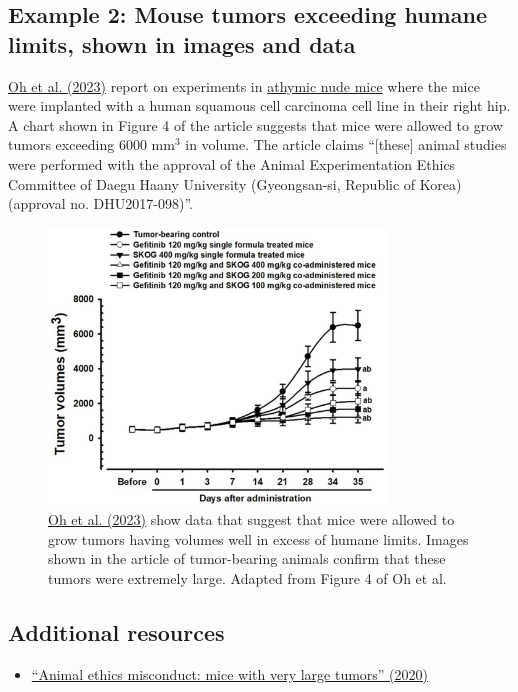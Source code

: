 \documentclass[letterpaper, 12pt]{article}
\begin{document}
\pagebreak

\subsection*{Example 2: Mouse tumors exceeding humane limits, shown in images and data}

\href{https://doi.org/10.3390/app13021090}{Oh et al. (2023)} report on experiments in \href{https://www.jax.org/strain/007850}{athymic nude mice} where the mice were implanted with a human squamous cell carcinoma cell line in their right hip. A chart shown in Figure 4 of the article suggests that mice were allowed to grow tumors exceeding 6000 mm$^3$ in volume. The article claims ``[these] animal studies were performed with the approval of the Animal Experimentation Ethics Committee of Daegu Haany University (Gyeongsan-si, Republic of Korea) (approval no. DHU2017-098)''.

\begin{figure}[h!tbp]
    \centering
    \includegraphics[width=0.8\textwidth]{img/tumor_burden/Screenshot 2025-04-04 at 15-50-26.png}
    \caption*{\href{https://doi.org/10.3390/app13021090}{Oh et al. (2023)} show data that suggest that mice were allowed to grow tumors having volumes well in excess of humane limits. Images shown in the article of tumor-bearing animals confirm that these tumors were extremely large. Adapted from Figure 4 of Oh et al.}
\end{figure}

\subsection*{Additional resources}

\begin{itemize}
    \setlength\itemsep{-0.5em}
    \item \href{https://scienceintegritydigest.com/2020/05/07/animal-ethics-misconduct-mice-with-very-large-tumors/}{``Animal ethics misconduct: mice with very large tumors'' (2020)}
\end{itemize}
\end{document}
